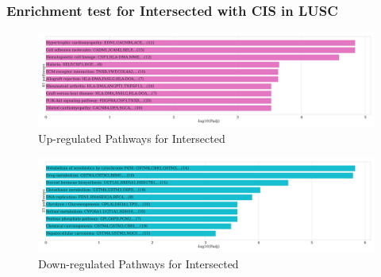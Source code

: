 \documentclass{beamer}
\begin{document}
    \begin{frame}
        \frametitle{Enrichment test for Intersected with CIS in LUSC}

        \begin{figure}
            \includegraphics[width=0.8 \linewidth]{figures/DEG/Enrichment/STAR.SQC-CIS.Both.Up.KEGG.pdf}
            \caption{Up-regulated Pathways for Intersected}
        \end{figure}

        \begin{figure}
            \includegraphics[width=0.8 \linewidth]{figures/DEG/Enrichment/STAR.SQC-CIS.Both.Down.KEGG.pdf}
            \caption{Down-regulated Pathways for Intersected}
        \end{figure}
    \end{frame}
\end{document}
